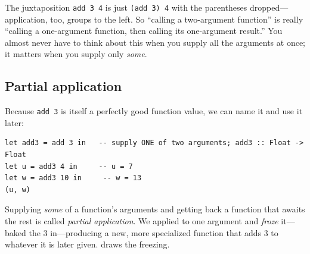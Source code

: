 \noindent The juxtaposition \lstinline[style=l4style]|add 3 4| is just
\lstinline[style=l4style]|(add 3) 4| with the parentheses dropped---application,
too, groups to the left. So ``calling a two-argument function'' is really
``calling a one-argument function, then calling its one-argument result.'' You
almost never have to think about this when you supply all the arguments at once;
it matters when you supply only \emph{some}.

\subsection{Partial application}

Because \lstinline[style=l4style]|add 3| is itself a perfectly good function value,
we can name it and use it later:

\begin{lstlisting}[style=l4style]
let add3 = add 3 in   -- supply ONE of two arguments; add3 :: Float -> Float
let u = add3 4 in     -- u = 7
let w = add3 10 in     -- w = 13
(u, w)
\end{lstlisting}

\noindent Supplying \emph{some} of a function's arguments and getting back a
function that awaits the rest is called \emph{partial application}. We applied
 to one argument and \emph{froze} it---baked the $3$ in---producing a
new, more specialized function  that adds $3$ to whatever it is later
given.  draws the freezing.

